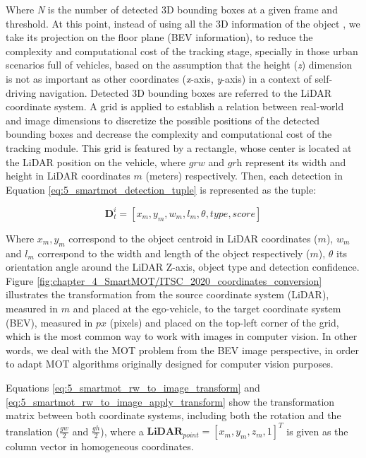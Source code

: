 Where \textit{N} is the number of detected 3D bounding boxes at a given frame and threshold. At this point, instead of using all the 3D information of the object \cite{chiu2021probabilistic, weng20203d}, we take its projection on the floor plane (\ac{BEV} information), to reduce the complexity and computational cost of the tracking stage, specially in those urban scenarios full of vehicles, based on the assumption that the height (\textit{z}) dimension is not as important as other coordinates (\textit{x}-axis, \textit{y}-axis) in a context of self-driving navigation. Detected 3D bounding boxes are referred to the LiDAR coordinate system. A grid is applied to establish a relation between real-world and image dimensions to discretize the possible positions of the detected bounding boxes and decrease the complexity and computational cost of the tracking module. This grid is featured by a rectangle, whose center is located at the LiDAR position on the vehicle, where $\textit{grw}$ and $\textit{grh}$ represent its width and height in LiDAR coordinates $\textit{m}$ (meters) respectively. Then, each detection in Equation \ref{eq:5_smartmot_detection_tuple} is represented as the tuple:

\begin{equation}
	\label{eq:5_smartmot_detection_tuple}
	\textbf{D}_{t}^{i} = [x_{m},y_{m},w_{m},l_{m},\theta,type,score]
\end{equation}

Where $\textit{$x_{m},y_{m}$}$ correspond to the object centroid in LiDAR coordinates ($\textit{m}$), $\textit{$w_{m}$}$ and $\textit{$l_{m}$}$ correspond to the width and length of the object respectively ($\textit{m}$), $\theta$ its orientation angle around the LiDAR Z-axis, object type and detection confidence. Figure \ref{fig:chapter_4_SmartMOT/ITSC_2020_coordinates_conversion} illustrates the transformation from the source coordinate system (LiDAR), measured in $\textit{m}$ and placed at the ego-vehicle, to the target coordinate system (BEV), measured in $\textit{px}$ (pixels) and placed on the top-left corner of the grid, which is the most common way to work with images in computer vision. In other words, we deal with the \ac{MOT} problem from the \ac{BEV} image perspective, in order to adapt \ac{MOT} algorithms originally designed for computer vision purposes. 

Equations \ref{eq:5_smartmot_rw_to_image_transform} and \ref{eq:5_smartmot_rw_to_image_apply_transform} show the transformation matrix between both coordinate systems, including both the rotation and the translation (\textit{$\frac{gw}{2}$} and \textit{$\frac{gh}{2}$}), where a $\textbf{LiDAR}_{point}=[x_{m},y_{m},z_{m},1]^{T}$ is given as the column vector in homogeneous coordinates.

